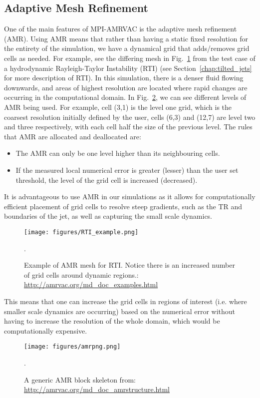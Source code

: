 \subsection{Adaptive Mesh Refinement}
\label{ssec:amr}
One of the main features of MPI-AMRVAC is the adaptive mesh refinement (AMR). Using AMR means that rather than having a static fixed resolution for the entirety of the simulation, we have a dynamical grid that adds/removes grid cells as needed. For example, see the differing mesh in Fig.~\ref{amr_example} from the test case of a hydrodynamic Rayleigh-Taylor Instability (RTI) (see Section~\ref{chap:tilted_jets} for more description of RTI). In this simulation, there is a denser fluid flowing downwards, and areas of highest resolution are located where rapid changes are occurring in the computational domain. In Fig.~\ref{amr_scheme}, we can see different levels of AMR being used. For example, cell (3,1) is the level one grid, which is the coarsest resolution initially defined by the user, cells (6,3) and (12,7) are level two and three respectively, with each cell half the size of the previous level. The rules that AMR are allocated and deallocated are:
\begin{itemize}
    \item The AMR can only be one level higher than its neighbouring cells.
    \item If the measured local numerical error is greater (lesser) than the user set threshold, the level of the grid cell is increased (decreased).
\end{itemize}
It is advantageous to use AMR in our simulations as it allows for computationally efficient placement of grid cells to resolve steep gradients, such as the TR and boundaries of the jet, as well as capturing the small scale dynamics.  
\begin{figure}
\centering
\texttt{[image: figures/RTI\_example.png]}
\caption{Example of AMR mesh for RTI. Notice there is an increased number of grid cells around dynamic regions.: \url{http://amrvac.org/md_doc_examples.html}}.
\label{amr_example}
\end{figure}   
This means that one can increase the grid cells in regions of interest (i.e. where smaller scale dynamics are occurring) based on the numerical error without having to increase the resolution of the whole domain, which would be computationally expensive.
\begin{figure}
\centering
\texttt{[image: figures/amrpng.png]}
\caption{A generic AMR block skeleton from: \url{http://amrvac.org/md_doc_amrstructure.html}}.
\label{amr_scheme}
\end{figure}   
